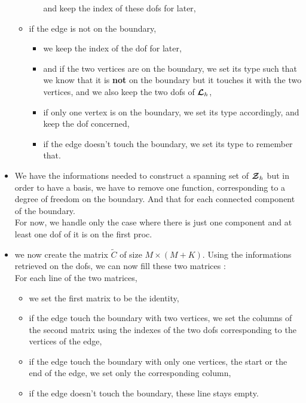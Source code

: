 \begin{itemize}
\begin{itemize}
\begin{itemize}
      and keep the index of these dofs for later,
    \end{itemize}
  \item
    if the edge is not on the boundary,
    \begin{itemize}
    \item
      we keep the index of the dof for later,
    \item
      and if the two vertices are on the boundary, we set its type such that we
      know that it is {\bf not} on the boundary but it touches it with the two
      vertices, and we also keep the two dofs of ${\bm{\mathcal{L}}}_h$,
    \item
      if only one vertex is on the boundary, we set its type accordingly, and
      keep the dof concerned,
    \item
      if the edge doesn't touch the boundary, we set its type to remember that.
    \end{itemize}
  \end{itemize}
\item
  We have the informations needed to construct a spanning set of ${\bm{\mathcal{Z}}}_h$ but in order to have a basis, we have to remove one function, corresponding to a degree of freedom on the boundary. And that for each connected component of the boundary.\\
  For now, we handle only the case where there is just one component and at least one dof of it is on the first proc. 
  
\item
  we now create the matrix $\tilde{C}$ of size $M\times (M+K)$. Using the informations retrieved on the dofs, we can now fill these two matrices :\\
  For each line of the two matrices,
  \begin{itemize}
  \item
    we set the first matrix to be the identity,
  \item
    if the edge touch the boundary with two vertices, we set the columns of
    the second matrix using the indexes of the two dofs corresponding to the
    vertices of the edge,
  \item
    if the edge touch the boundary with only one vertices, the start or the end of the edge, we set only the
    corresponding column,
  \item
    if the edge doesn't touch the boundary, these line stays empty. 
  \end{itemize}
  

\end{itemize}
